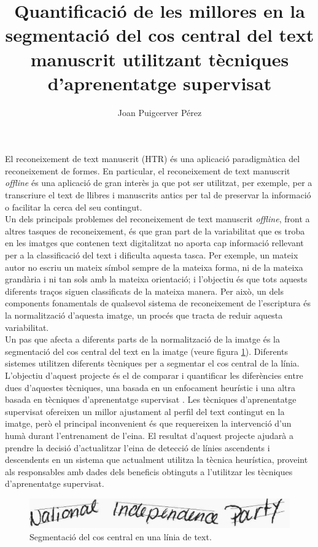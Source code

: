 \documentclass[a4paper]{article}
\author{Joan Puigcerver Pérez}
\title{Quantificació de les millores en la segmentació del cos central del text manuscrit utilitzant tècniques d'aprenentatge supervisat}
\begin{document}
\maketitle

El reconeixement de text manuscrit (HTR) és una aplicació paradigmàtica del reconeixement de formes. En particular, el reconeixement de text manuscrit \emph{offline} és una aplicació de gran interès ja que pot ser utilitzat, per exemple, per a transcriure el text de llibres i manuscrits antics per tal de preservar la informació o facilitar la cerca del seu contingut. \\

Un dels principals problemes del reconeixement de text manuscrit \emph{offline}, front a altres tasques de reconeixement, és que gran part de la variabilitat que es troba en les imatges que contenen text digitalitzat no aporta cap informació rellevant per a la classificació del text i dificulta aquesta tasca. Per exemple, un mateix autor no escriu un mateix símbol sempre de la mateixa forma, ni de la mateixa grandària i ni tan sols amb la mateixa orientació; i l'objectiu és que tots aquests diferents traços siguen classificats de la mateixa manera. Per això, un dels components fonamentals de qualsevol sistema de reconeixement de l'escriptura és la normalització d'aquesta imatge, un procés que tracta de reduir aquesta variabilitat. \\

Un pas que afecta a diferents parts de la normalització de la imatge és la segmentació del cos central del text en la imatge (veure figura \ref{fig:adlines}). Diferents sistemes utilitzen diferents tècniques per a segmentar el cos central de la línia. L'objectiu d'aquest projecte és el de comparar i quantificar les diferències entre dues d'aquestes tècniques, una basada en un enfocament heurístic \cite{Pastor07} i una altra basada en tècniques d'aprenentatge supervisat \cite{Espana10}. Les tècniques d'aprenentatge supervisat ofereixen un millor ajustament al perfil del text contingut en la imatge, però el principal inconvenient és que requereixen la intervenció d'un humà durant l'entrenament de l'eina. El resultat d'aquest projecte ajudarà a prendre la decisió d'actualitzar l'eina de detecció de línies ascendents i descendents en un sistema que actualment utilitza la tècnica heurística, proveint als responsables amb dades dels beneficis obtinguts a l'utilitzar les tècniques d'aprenentatge supervisat.

\begin{figure}[H]
\includegraphics[width=\textwidth]{a01-011x-01_final}
\caption{Segmentació del cos central en una línia de text.}
\label{fig:adlines}
\end{figure}
\end{document}

